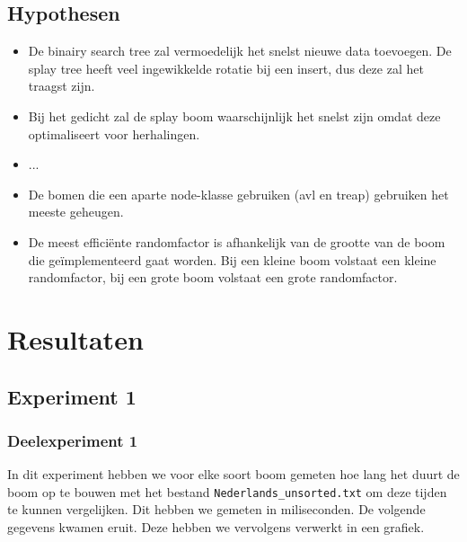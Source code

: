 \documentclass[a4paper,10pt]{article}
\begin{document}
\subsection{Hypothesen}

\begin{itemize}
\item De binairy search tree zal vermoedelijk het snelst nieuwe data toevoegen. De splay tree heeft veel ingewikkelde rotatie bij een insert, dus deze zal het traagst zijn.
\item Bij het gedicht zal de splay boom waarschijnlijk het snelst zijn omdat deze optimaliseert voor herhalingen.
\item ...
\item De bomen die een aparte node-klasse gebruiken (avl en treap) gebruiken het meeste geheugen.
\item De meest effici\"ente randomfactor is afhankelijk van de grootte van de boom die geïmplementeerd gaat worden. Bij een kleine boom volstaat een kleine randomfactor, bij een grote boom volstaat een grote randomfactor.
\end{itemize}

\section{Resultaten}

\subsection{Experiment 1}
\subsubsection{Deelexperiment 1}
In dit experiment hebben we voor elke soort boom gemeten hoe lang het duurt de boom op te bouwen met het bestand  \texttt{Nederlands\_unsorted.txt} om deze tijden te kunnen vergelijken. Dit hebben we gemeten in miliseconden. De volgende gegevens kwamen eruit. Deze hebben we vervolgens verwerkt in een grafiek. \\
\end{document}
